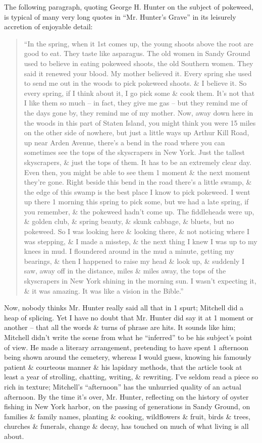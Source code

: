 \documentclass{article}
\begin{document}
The following paragraph, quoting George H. Hunter on the subject of pokeweed, is typical of many very long quotes in ``Mr. Hunter's Grave'' in its leisurely accretion of enjoyable detail:
\begin{quotation}
	``In the spring, when it 1st comes up, the young shoots above the root are good to eat. They taste like asparagus. The old women in Sandy Ground used to believe in eating pokeweed shoots, the old Southern women. They said it renewed your blood. My mother believed it. Every spring she used to send me out in the woods to pick pokeweed shoots. \& I believe it. So every spring, if I think about it, I go pick some \& cook them. It's not that I like them so much -- in fact, they give me gas -- but they remind me of the days gone by, they remind me of my mother. Now, away down here in the woods in this part of Staten Island, you might think you were 15 miles on the other side of nowhere, but just a little ways up Arthur Kill Road, up near Arden Avenue, there's a bend in the road where you can sometimes see the tops of the skyscrapers in New York. Just the tallest skyscrapers, \& just the tops of them. It has to be an extremely clear day. Even then, you might be able to see them 1 moment \& the next moment they're gone. Right beside this bend in the road there's a little swamp, \& the edge of this swamp is the best place I know to pick pokeweed. I went up there 1 morning this spring to pick some, but we had a late spring, if you remember, \& the pokeweed hadn't come up. The fiddleheads were up, \& golden club, \& spring beauty, \& skunk cabbage, \& bluets, but no pokeweed. So I was looking here \& looking there, \& not noticing where I was stepping, \& I made a misstep, \& the next thing I knew I was up to my knees in mud. I floundered around in the mud a minute, getting my bearings, \& then I happened to raise my head \& look up, \& suddenly I saw, away off in the distance, miles \& miles away, the tops of the skyscrapers in New York shining in the morning sun. I wasn't expecting it, \& it was amazing. It was like a vision in the Bible.''
\end{quotation}
Now, nobody thinks Mr. Hunter really said all that in 1 spurt; Mitchell did a heap of splicing. Yet I have no doubt that Mr. Hunter did say it at 1 moment or another -- that all the words \& turns of phrase are hits. It sounds like him; Mitchell didn't write the scene from what he ``inferred'' to be his subject's point of view. He made a literary arrangement, pretending to have spent 1 afternoon being shown around the cemetery, whereas I would guess, knowing his famously patient \& courteous manner \& his lapidary methods, that the article took at least a year of strolling, chatting, writing, \& rewriting. I've seldom read a piece so rich in texture; Mitchell's ``afternoon'' has the unhurried quality of an actual afternoon. By the time it's over, Mr. Hunter, reflecting on the history of oyster fishing in New York harbor, on the passing of generations in Sandy Ground, on families \& family names, planting \& cooking, wildflowers \& fruit, birds \& trees, churches \& funerals, change \& decay, has touched on much of what living is all about.
\end{document}
